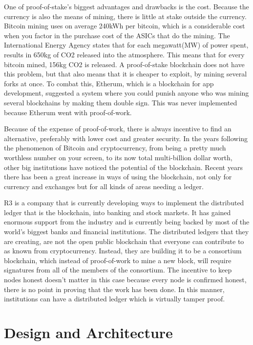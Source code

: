 \documentclass[11pt]{article}
\begin{document}
One of proof-of-stake's biggest advantages and drawbacks is the cost. Because the currency is also the means of mining, there is little at stake outside the currency. Bitcoin mining uses on average 240kWh per bitcoin, which is a considerable cost when you factor in the purchase cost of the ASICs that do the mining. The International Energy Agency states that for each megawatt(MW) of power spent, results in 650kg of CO2 released into the atmosphere. This means that for every bitcoin mined, 156kg CO2 is released. A proof-of-stake blockchain does not have this problem, but that also means that it is cheaper to exploit, by mining several forks at once. To combat this, Etherum, which is a blockchain for app development, suggested a system where you could punish anyone who was mining several blockchains by making them double sign. This was never implemented because Etherum went with proof-of-work. 

Because of the expense of proof-of-work, there is always incentive to find an alternative, preferably with lower cost and greater security. In the years following the phenomenon of Bitcoin and cryptocurrency, from being a pretty much worthless number on your screen, to its now total multi-billion dollar worth, other big institutions have noticed the potential of the blockchain. Recent years there has been a great increase in ways of using the blockchain, not only for currency and exchanges but for all kinds of areas needing a ledger.

R3 is a company that is currently developing ways to implement the distributed ledger that is the blockchain, into banking and stock markets. It has gained enormous support from the industry and is currently being backed by most of the world's biggest banks and financial institutions. The distributed ledgers that they are creating, are not the open public blockchain that everyone can contribute to as known from cryptocurrency. Instead, they are building it to be a consortium blockchain, which instead of proof-of-work to mine a new block, will require signatures from all of the members of the consortium. The incentive to keep nodes honest doesn't matter in this case because every node is confirmed honest, there is no point in proving that the work has been done. In this manner, institutions can have a distributed ledger which is virtually tamper proof. 


\section{Design and Architecture}
\end{document}
